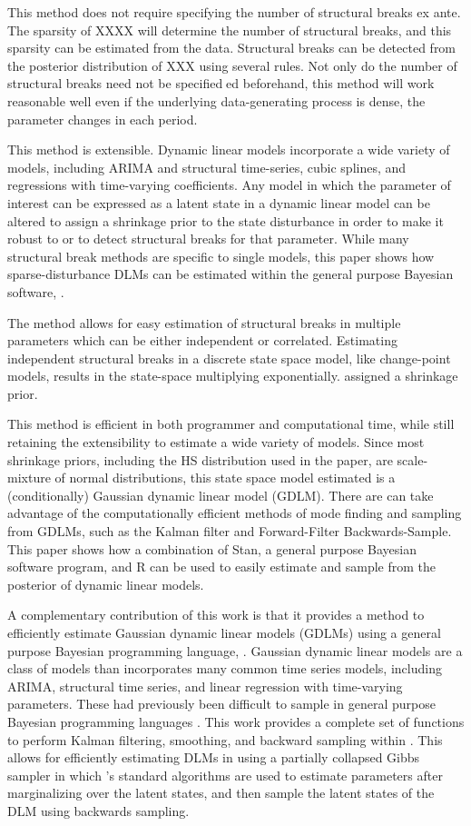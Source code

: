 This method does not require specifying the number of structural breaks ex ante.
The sparsity of XXXX will determine the number of structural breaks, and this sparsity can be estimated from the data.
Structural breaks can be detected from the posterior distribution of XXX using several rules. Not only do
the number of structural breaks need not be specifieded beforehand, this method will work reasonable
well even if the underlying data-generating process is dense, \ie{}the parameter changes in each period.

This method is extensible. 
Dynamic linear models incorporate a wide variety of models, including ARIMA
and structural time-series, cubic splines, and regressions with time-varying coefficients. Any model in
which the parameter of interest can be expressed as a latent state in a dynamic linear model can be
altered to assign a shrinkage prior to the state disturbance in order to make it robust to or to detect
structural breaks for that parameter. While many structural break methods are specific to single
models, this paper shows how sparse-disturbance DLMs can be estimated within the general purpose
Bayesian software, \Stan{}.

The method allows for easy estimation of structural breaks in multiple parameters which can be either
independent or correlated. Estimating independent structural breaks in a discrete state space model,
like change-point models, results in the state-space multiplying exponentially.
assigned a shrinkage prior.

This method is efficient in both programmer and computational time, while still retaining the extensibility to estimate a wide variety of models. Since most shrinkage priors, including the HS distribution
used in the paper, are scale-mixture of normal distributions, this state space model estimated is a
(conditionally) Gaussian dynamic linear model (GDLM). There are can take advantage of the computationally
efficient methods of mode finding and sampling from GDLMs, such as the Kalman filter and
Forward-Filter Backwards-Sample. This paper shows how a combination of Stan, a general purpose
Bayesian software program, and R can be used to easily estimate and sample from the posterior of
dynamic linear models.

A complementary contribution of this work is that it provides a method to efficiently estimate Gaussian dynamic linear models (GDLMs) using a general purpose Bayesian programming language, \Stan{}.
Gaussian dynamic linear models are a class of models than incorporates many common time series models, including ARIMA, structural time series, and linear regression with time-varying parameters.
These had previously been difficult to sample in general purpose Bayesian programming languages \parencite[477]{Jackman2009}.
This work provides a complete set of functions to perform Kalman filtering, smoothing, and backward sampling within \Stan{}.
This allows for efficiently estimating DLMs in \Stan{} using a partially collapsed Gibbs sampler in which \Stan{}'s standard algorithms are used to estimate parameters after marginalizing over the latent states, and then sample the latent states of the DLM using backwards sampling.

